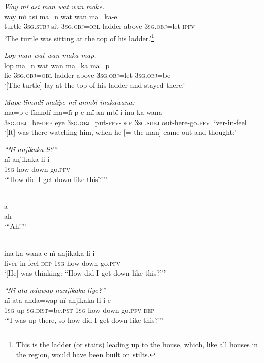 \ex \textit{Way m}{\textit{ï}} \textit{asi man w}{\textit{a}}\textit{t wan make.}\\
\gll way  m{ï} asi  ma=n      w{a}t    wan  ma{=}k{a-e}\\
turtle  3\textsc{sg.subj}  sit  3\textsc{sg.obj=obl}  ladder  above  3\textsc{sg.obj}=let-\textsc{ipfv}\\
\glt ‘The turtle was sitting at the top of his ladder.’\footnote{This is the ladder (or stairs) leading up to the house, which, like all houses in the region, would have been built on stilts.}

\ex \textit{Lop man wat wan maka map.}\\
\gll lop  ma=n{} wat    wan  ma{=}ka    ma{=}p\\
lie  3\textsc{sg.obj=obl}  ladder  above  3\textsc{sg.obj}=let  3\textsc{sg.obj}=be\\
\glt ‘[The turtle] lay at the top of his ladder and stayed there.’

\ex \textit{Mape lïmndï mal}{\textit{ï}}\textit{pe mï anmbi} {\textit{inakawana:}}\\
\gll ma{=}p{{}-}e      lïmndï  ma{=}l{ï-}p{{}-}e        mï      an{{}-}mbï-{i} {ina-ka-wana}\\
3\textsc{sg.obj}=be\textsc{{}-dep} eye    3\textsc{sg.obj}=put-\textsc{pfv-dep}  3\textsc{sg.subj}  out-here-go.\textsc{pfv} liver-in-feel\\
\glt ‘[It] was there watching him, when he [= the man] came out and thought:’

\ex \textit{“Nï anjikaka li?”}\\
\gll nï    anjikaka  li-i\\
1\textsc{sg}  how    down-go.\textsc{pfv}\\
\glt ‘“How did I get down like this?”’

\\
\gll a\\
ah\\
\glt ‘“{Ah!”}’

\\
\gll ina-ka-wana-e    nï    anjikaka  li-i\\
liver-in-feel-\textsc{dep}  1\textsc{sg}  how    down-go.\textsc{pfv}\\
\glt ‘[He] was thinking: “{How did I get down like this?”}’

\ex \textit{“N}{\textit{ï ata}} \textit{ndaw}{\textit{ap}} \textit{nanjikaka liye?”}\\
\gll nï    ata  anda=wap nï    anjikaka  li-i-e\\
1\textsc{sg}  up  \textsc{sg.dist}=be.\textsc{pst}  1\textsc{sg}  how    down-go.\textsc{pfv-dep}\\
\glt ‘“{I was up there, so how did I get down like this?”}’

